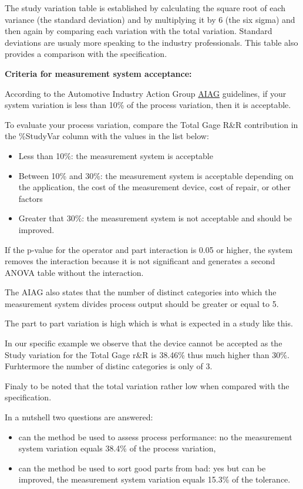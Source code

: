 \documentclass[
]{book}
\providecommand{\tightlist}{%
  \setlength{\itemsep}{0pt}\setlength{\parskip}{0pt}}
\begin{document}
The study variation table is established by calculating the square root of each variance (the standard deviation) and by multiplying it by 6 (the six sigma) and then again by comparing each variation with the total variation. Standard deviations are usualy more speaking to the industry professionals. This table also provides a comparison with the specification.

\textbf{Criteria for measurement system acceptance:}

According to the Automotive Industry Action Group \href{https://www.aiag.org/}{AIAG} guidelines, if your system variation is less than 10\% of the process variation, then it is acceptable.

To evaluate your process variation, compare the Total Gage R\&R contribution in the \%StudyVar column with the values in the list below:

\begin{itemize}
\tightlist
\item
  Less than 10\%: the measurement system is acceptable
\item
  Between 10\% and 30\%: the measurement system is acceptable depending on the application, the cost of the measurement device, cost of repair, or other factors
\item
  Greater that 30\%: the measurement system is not acceptable and should be improved.
\end{itemize}

If the p-value for the operator and part interaction is 0.05 or higher, the system removes the interaction because it is not significant and generates a second ANOVA table without the interaction.

The AIAG also states that the number of distinct categories into which the measurement system divides process output should be greater or equal to 5.

The part to part variation is high which is what is expected in a study like this.

In our specific example we observe that the device cannot be accepted as the Study variation for the Total Gage r\&R is 38.46\% thus much higher than 30\%. Furhtermore the number of distinc categories is only of 3.

Finaly to be noted that the total variation rather low when compared with the specification.

In a nutshell two questions are answered:

\begin{itemize}
\item
  can the method be used to assess process performance: no the measurement system variation equals 38.4\% of the process variation,
\item
  can the method be used to sort good parts from bad: yes but can be improved, the measurement system variation equals 15.3\% of the tolerance.
\end{itemize}
\end{document}
